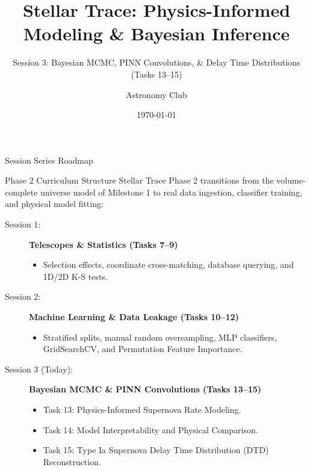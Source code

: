 \documentclass[9pt]{beamer}
\title{Stellar Trace: Physics-Informed Modeling \& Bayesian Inference}
\subtitle{Session 3: Bayesian MCMC, PINN Convolutions, \& Delay Time Distributions (Tasks 13--15)}
\author{Astronomy Club}
\date{\today}
\begin{document}
\maketitle

\begin{frame}{Session Series Roadmap}
  \begin{block}{Phase 2 Curriculum Structure}
    Stellar Trace Phase 2 transitions from the volume-complete universe model of Milestone 1 to real data ingestion, classifier training, and physical model fitting:
  \end{block}
  \begin{description}
    \item[Session 1:] \textbf{Telescopes \& Statistics (Tasks 7--9)}
      \begin{itemize}
        \item Selection effects, coordinate cross-matching, database querying, and 1D/2D K-S tests.
      \end{itemize}
    \item[Session 2:] \textbf{Machine Learning \& Data Leakage (Tasks 10--12)}
      \begin{itemize}
        \item Stratified splits, manual random oversampling, MLP classifiers, GridSearchCV, and Permutation Feature Importance.
      \end{itemize}
    \item[Session 3 (Today):] \textbf{Bayesian MCMC \& PINN Convolutions (Tasks 13--15)}
      \begin{itemize}
        \item Task 13: Physics-Informed Supernova Rate Modeling.
        \item Task 14: Model Interpretability and Physical Comparison.
        \item Task 15: Type Ia Supernova Delay Time Distribution (DTD) Reconstruction.
      \end{itemize}
  \end{description}
\end{frame}
\end{document}
